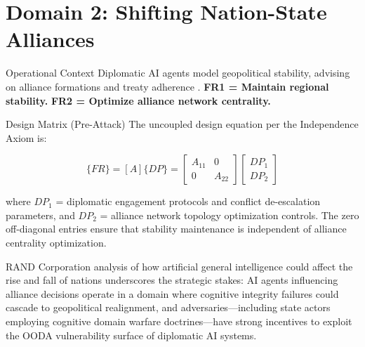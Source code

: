 \documentclass[
  ignorenonframetext,
]{beamer}
\author{\texorpdfstring{}{}}
\date{}
\begin{document}
\section{Domain 2: Shifting Nation-State
Alliances}\label{sec:domain_nation_state}

\begin{frame}[allowframebreaks]{Operational Context}
\protect{}\label{operational-context}
Diplomatic AI agents model geopolitical stability, advising on alliance
formations and treaty adherence
\cite{schelling1960strategy, axelrod1984evolution}. \textbf{FR1 =
Maintain regional stability.} \textbf{FR2 = Optimize alliance network
centrality.}

\begin{block}{Design Matrix (Pre-Attack)}
\protect{}\label{design-matrix-pre-attack}
The uncoupled design equation per the Independence Axiom
\cite{suh2001axiomatic} is:

\begin{equation}
\{FR\} = [A]\{DP\} = \begin{bmatrix} A_{11} & 0 \\ 0 & A_{22} \end{bmatrix} \begin{bmatrix} DP_1 \\ DP_2 \end{bmatrix}
\label{eq:nation_state_baseline}
\end{equation}

where \(DP_1\) = diplomatic engagement protocols and conflict
de-escalation parameters, and \(DP_2\) = alliance network topology
optimization controls. The zero off-diagonal entries ensure that
stability maintenance is independent of alliance centrality
optimization.

RAND Corporation analysis \cite{rand2025agi} of how artificial general
intelligence could affect the rise and fall of nations underscores the
strategic stakes: AI agents influencing alliance decisions operate in a
domain where cognitive integrity failures could cascade to geopolitical
realignment, and adversaries---including state actors employing
cognitive domain warfare doctrines---have strong incentives to exploit
the OODA vulnerability surface of diplomatic AI systems.
\end{block}
\end{frame}
\end{document}
